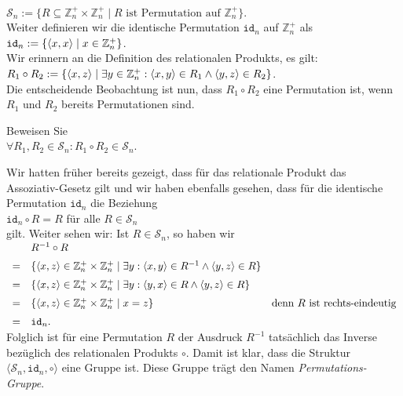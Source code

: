 \\[0.2cm]
\hspace*{1.3cm}
$\mathcal{S}_n := \{ R \subseteq \mathbb{Z}_n^+ \times \mathbb{Z}_n^+ \mid \mbox{$R$ ist Permutation auf $\mathbb{Z}_n^+$} \}$.
\\[0.2cm]
Weiter definieren wir die identische Permutation $\mathtt{id}_n$ auf $\mathbb{Z}_n^+$ als
\\[0.2cm]
\hspace*{1.3cm}
$\mathtt{id}_n := \{ \pair(x,x) \mid x \in \mathbb{Z}_n^+ \}$.
\\[0.2cm]
Wir erinnern an die Definition des relationalen Produkts, es gilt:
\\[0.2cm]
\hspace*{1.3cm}
$R_1 \circ R_2 := \{ \pair(x,z) \mid \exists y \in \mathbb{Z}_n^+: \pair(x,y) \in R_1 \wedge \pair(y,z) \in R_2 \}$.
\\[0.2cm]
Die entscheidende Beobachtung ist nun, dass $R_1 \circ R_2$ eine Permutation ist, wenn $R_1$ und $R_2$
bereits Permutationen sind.

\exercise
Beweisen Sie
\\[0.2cm]
\hspace*{1.3cm}
$\forall R_1, R_2 \in \mathcal{S}_n: R_1 \circ R_2 \in \mathcal{S}_n$.
\exend


\remark
Wir hatten früher bereits gezeigt, dass für das relationale Produkt das Assoziativ-Gesetz gilt und wir
haben ebenfalls gesehen, dass für die identische Permutation $\mathtt{id}_n$ die Beziehung
\\[0.2cm]
\hspace*{1.3cm}
$\mathtt{id}_n \circ R = R$ \quad für alle $R \in \mathcal{S}_n$
\\[0.2cm]
gilt.  Weiter sehen wir: Ist $R \in \mathcal{S}_n$, so haben wir
\\[0.2cm]
\hspace*{1.3cm}
$
\begin{array}[t]{cll}
   & R^{-1} \circ R \\[0.2cm]
 = & \{ \pair(x,z) \in \mathbb{Z}_n^+\times \mathbb{Z}_n^+ \mid \exists y: 
        \pair(x,y) \in R^{-1} \wedge \pair(y,z) \in R 
     \} \\[0.2cm]
 = & \{ \pair(x,z) \in \mathbb{Z}_n^+ \times \mathbb{Z}_n^+ \mid 
        \exists y: \pair(y,x) \in R \wedge \pair(y,z) \in R 
     \} 
   & \\[0.2cm]
 = & \{ \pair(x,z) \in \mathbb{Z}_n^+ \times \mathbb{Z}_n^+ \mid x = z \}
    & \mbox{denn $R$ ist rechts-eindeutig}    \\[0.2cm]
 = & \mathtt{id}_n.
\end{array}
$
\\[0.2cm]
Folglich ist für eine Permutation $R$ der Ausdruck $R^{-1}$ tatsächlich das Inverse bezüglich des
relationalen Produkts $\circ$.  Damit ist klar, dass die 
Struktur $\langle \mathcal{S}_n, \mathtt{id}_n, \circ \rangle$ eine Gruppe ist.
Diese Gruppe trägt den Namen \emph{Permutations-Gruppe}.
\eox

